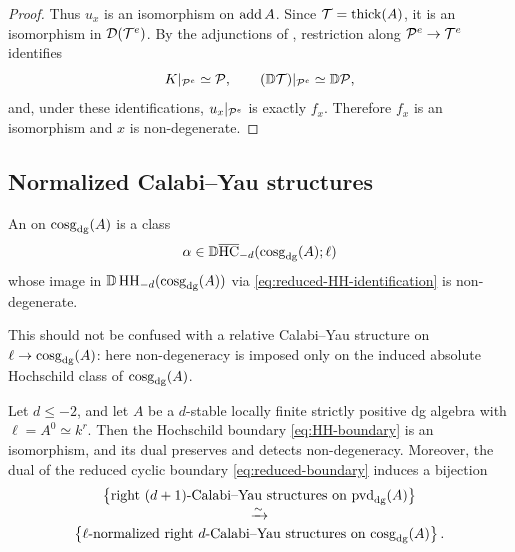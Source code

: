 \documentclass[11pt,a4paper,dvipsnames,x11names]{amsart}
\begin{document}
\begin{proof}
Thus $u_x$ is an isomorphism on $\operatorname{add} A$. Since $\mathcal T=\operatorname{thick}(A)$, it is an isomorphism in $\mathcal D(\mathcal T^e)$. By the adjunctions of \cite[Lemma~4.2.1]{HaniharaLiu26}, restriction along $\mathcal P^e\to\mathcal T^e$ identifies
\[
    K|_{\mathcal P^e}\simeq\mathcal P,
    \qquad
    (\mathbb D\mathcal T)|_{\mathcal P^e}\simeq \mathbb D\mathcal P,
\]
and, under these identifications, $u_x|_{\mathcal P^e}$ is exactly $f_x$. Therefore $f_x$ is an isomorphism and $x$ is non-degenerate.
\end{proof}

\subsection{Normalized Calabi--Yau structures}

\begin{dfn}\label{dfn:normalized-CY}
An  on $\operatorname{cosg}_{\mathrm{dg}}(A)$ is a class
\[
\alpha\in \mathbb D\overline{\operatorname{HC}}_{-d}(\operatorname{cosg}_{\mathrm{dg}}(A);\ell)
\]
whose image in $\mathbb D\operatorname{HH}_{-d}(\operatorname{cosg}_{\mathrm{dg}}(A))$ via \eqref{eq:reduced-HH-identification} is non-degenerate.
\end{dfn}

This should not be confused with a relative Calabi--Yau structure on $\ell\to\operatorname{cosg}_{\mathrm{dg}}(A)$: here non-degeneracy is imposed only on the induced absolute Hochschild class of $\operatorname{cosg}_{\mathrm{dg}}(A)$.

\begin{thm}\label{thm:normalized-CY}
Let $d\leq-2$, and let $A$ be a $d$-stable locally finite strictly positive dg algebra with $\ell=A^0\simeq k^r$. Then the Hochschild boundary \eqref{eq:HH-boundary} is an isomorphism, and its dual preserves and detects non-degeneracy. Moreover, the dual of the reduced cyclic boundary \eqref{eq:reduced-boundary} induces a bijection
\[
\begin{gathered}
\left\{\text{right $(d+1)$-Calabi--Yau structures on $\operatorname{pvd}_{\mathrm{dg}}(A)$}\right\}\\[-1mm]
\xrightarrow{\sim}\\[-1mm]
\left\{\text{$\ell$-normalized right $d$-Calabi--Yau structures on $\operatorname{cosg}_{\mathrm{dg}}(A)$}\right\}.
\end{gathered}
\]
\end{thm}
\end{document}
